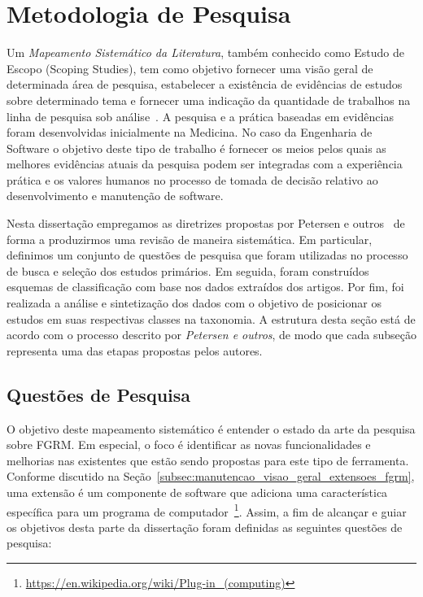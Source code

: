 \section{Metodologia de Pesquisa}
\label{sec:map-metodologia}

Um \textit{Mapeamento Sistemático da Literatura}, também conhecido como Estudo
de Escopo (Scoping Studies), tem como objetivo fornecer uma visão geral de
determinada área de pesquisa, estabelecer a existência de evidências de estudos
sobre determinado tema e fornecer uma indicação da quantidade de trabalhos na
linha de pesquisa sob
análise~\cite{keele2007guidelines,wohlin2012experimentation}. A pesquisa e a
prática baseadas em evidências foram desenvolvidas inicialmente na Medicina. No
caso da Engenharia de Software o objetivo deste tipo de trabalho é fornecer os
meios pelos quais as melhores evidências atuais da pesquisa podem ser integradas
com a experiência prática e os valores humanos no processo de tomada de decisão
relativo ao desenvolvimento e manutenção de software.

Nesta dissertação empregamos as diretrizes propostas por Petersen e
outros~\cite{Petersen2008} de forma a produzirmos uma revisão de maneira
sistemática. Em particular, definimos um conjunto de questões de
pesquisa que foram utilizadas no processo de busca e seleção dos estudos
primários. Em seguida, foram construídos esquemas de classificação com base nos
dados extraídos dos artigos. Por fim, foi realizada a análise e sintetização dos
dados com o objetivo de posicionar os estudos em suas respectivas classes na
taxonomia. A estrutura desta seção está de acordo com o processo descrito por
\textit{Petersen e outros}, de modo que cada subseção representa uma das etapas
propostas pelos autores.

\subsection{Questões de Pesquisa}
\label{subsec:map-questoes-de-pesquisa}

O objetivo deste mapeamento sistemático é entender o estado da arte da pesquisa
sobre FGRM\@. Em especial, o foco é identificar as novas funcionalidades e
melhorias nas existentes que estão sendo propostas para este tipo de ferramenta.
Conforme discutido na Seção~\ref{subsec:manutencao_visao_geral_extensoes_fgrm},
uma extensão é um componente de software que adiciona uma característica
específica para um programa de
computador~\footnote{\url{https://en.wikipedia.org/wiki/Plug-in_(computing)}}.
Assim, a fim de alcançar e guiar os objetivos desta parte da dissertação foram
definidas as seguintes questões de pesquisa:

